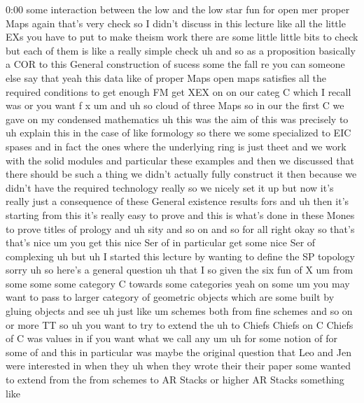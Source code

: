 \begin{unfinished}{0:00}
some  interaction  between  the  low  and  the
low  star  fun  for  open  mer  proper  Maps
again  that's  very
check
so  I  didn't  discuss  in  this  lecture  like
all  the  little  EXs  you  have  to  put  to
make  theism  work  there  are  some  little
little  bits  to  check  but  each  of  them  is
like  a  really  simple  check  uh  and  so  as
a
proposition  basically  a  COR  to  this
General  construction  of  sucess  some  the
fall  re  you  can  someone  else  say  that
yeah  this  data  like  of  proper  Maps  open
maps
satisfies  all  the  required
conditions  to  get  enough
FM  get
XEX  on  on  our  categ  C  which  I  recall
was  or  you  want  f
x  um  and  uh  so  cloud  of  three
Maps
so  in  our  the  first  C  we  gave  on  my
condensed  mathematics  uh  this  was  the
aim  of  this  was  precisely  to  uh  explain
this  in  the  case  of  like  formology  so
there  we  some  specialized  to  EIC  spases
and  in  fact  the  ones  where  the
underlying  ring  is  just  theet  and  we
work  with  the  solid  modules  and
particular  these  examples  and  then  we
discussed  that  there  should  be  such  a
thing  we  didn't  actually  fully  construct
it  then  because  we  didn't  have  the
required  technology  really  so  we  nicely
set  it  up  but  now  it's  really  just  a
consequence  of  these  General  existence
results
fors  and  uh  then  it's  starting  from  this
it's  really  easy  to  prove  and  this  is
what's  done  in  these  Mones  to  prove
titles  of
prology  and  uh  sity  and  so  on  and  so
for  all  right
okay  so  that's  that's
nice  um  you  get  this  nice  Ser  of  in
particular  get  some  nice  Ser  of
complexing
uh
but  uh  I  started  this  lecture  by  wanting
to  define  the  SP  topology
sorry  uh
so  here's  a  general
question  uh  that
I  so  given  the  six
fun  of  X
um  from  some  some  some  category  C
towards  some
categories  yeah  on
some  um  you  may  want  to  pass  to  larger
category  of  geometric  objects  which  are
some  built  by  gluing  objects  and  see  uh
just  like  um  schemes  both  from  fine
schemes  and  so  on  or  more  TT  so  uh  you
want  to  try  to
extend
the  uh  to
Chiefs  Chiefs  on  C  Chiefs  of  C  was
values
in  if  you  want  what  we
call  any  um
uh  for  some  notion  of  for  some
of  and  this  in  particular  was  maybe  the
original  question  that  Leo  and  Jen  were
interested  in  when  they  uh  when  they
wrote  their  their  paper  some  wanted  to
extend  from
the  from  schemes  to  AR  Stacks  or  higher
AR  Stacks  something  like

\end{unfinished}
